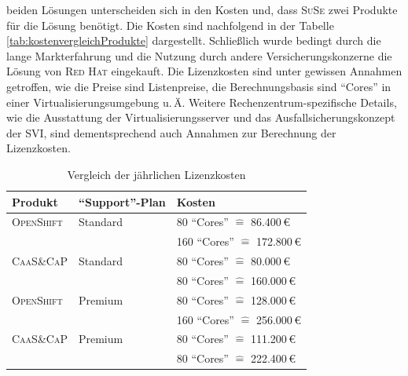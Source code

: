 beiden Lösungen unterscheiden sich in den Kosten und, dass \textsc{SuSe} zwei Produkte für die Lösung benötigt. Die Kosten sind nachfolgend in der Tabelle \vref{tab:kostenvergleichProdukte} dargestellt. Schließlich wurde bedingt durch die lange Markterfahrung und die Nutzung durch andere Versicherungskonzerne die Lösung von \textsc{Red Hat} eingekauft. Die Lizenzkosten sind unter gewissen Annahmen getroffen, wie die Preise sind Listenpreise, die Berechnungsbasis sind \enquote{Cores} in einer Virtualisierungsumgebung u.\,Ä. Weitere Rechenzentrum-spezifische Details, wie die Ausstattung der Virtualisierungsserver und das Ausfallsicherungskonzept der \ac{SVI}, sind dementsprechend auch Annahmen zur Berechnung der Lizenzkosten.

\begin{table}[h!]
	\centering
	
	\begin{tabular}{@{}lll@{}}\toprule[1.5pt]
		
		\textbf{Produkt} & \textbf{\enquote{Support}-Plan} & \textbf{Kosten} \\ \midrule
		\textsc{OpenShift} & Standard & 80 \enquote{Cores} $\widehat{=}$  86.400\,\euro \\
		& & 160 \enquote{Cores} $\widehat{=}$  172.800\,\euro \\
		
		\textsc{CaaS}\&\textsc{CaP} & Standard & 80 \enquote{Cores} $\widehat{=}$  80.000\,\euro \\
		& & 80 \enquote{Cores} $\widehat{=}$  160.000\,\euro \\
		
		\textsc{OpenShift} & Premium & 80 \enquote{Cores} $\widehat{=}$  128.000\,\euro \\
		& & 160 \enquote{Cores} $\widehat{=}$  256.000\,\euro \\
		
		\textsc{CaaS}\&\textsc{CaP} & Premium & 80 \enquote{Cores} $\widehat{=}$  111.200\,\euro \\
		& & 80 \enquote{Cores} $\widehat{=}$  222.400\,\euro \\		
		
		\bottomrule[1.5pt]
	\end{tabular}
	
	\caption{Vergleich der jährlichen Lizenzkosten}
	\label{tab:kostenvergleichProdukte}
	
\end{table}
